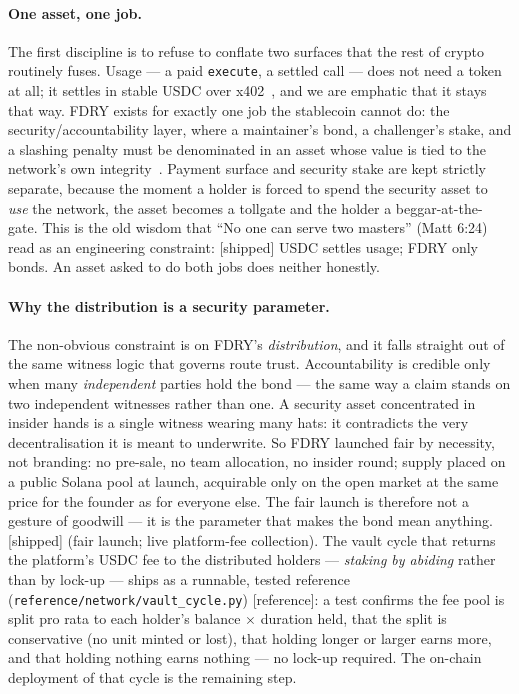\documentclass[11pt]{article}
\newcommand{\impl}{\textcolor{green!55!black}{\small[shipped]}}
\newcommand{\refimpl}{\textcolor{blue!70!black}{\small[reference]}}
\begin{document}
\paragraph{One asset, one job.} The first discipline is to refuse to conflate two
surfaces that the rest of crypto routinely fuses. Usage --- a paid
\texttt{execute}, a settled call --- does not need a token at all; it settles in
stable USDC over x402~\cite{x402}, and we are emphatic that it stays that way. FDRY
exists for exactly one job the stablecoin cannot do: the security/accountability
layer, where a maintainer's bond, a challenger's stake, and a slashing penalty must
be denominated in an asset whose value is tied to the network's own
integrity~\cite{internalapis}. Payment surface and security stake are kept strictly
separate, because the moment a holder is forced to spend the security asset to
\emph{use} the network, the asset becomes a tollgate and the holder a
beggar-at-the-gate. This is the old wisdom that ``No one can serve two masters''
(Matt 6:24) read as an engineering constraint: \impl{} USDC settles usage; FDRY
only bonds. An asset asked to do both jobs does neither honestly.

\paragraph{Why the distribution is a security parameter.} The non-obvious constraint
is on FDRY's \emph{distribution}, and it falls straight out of the same witness
logic that governs route trust. Accountability is credible only when many
\emph{independent} parties hold the bond --- the same way a claim stands on two
independent witnesses rather than one. A security asset concentrated in insider
hands is a single witness wearing many hats: it contradicts the very
decentralisation it is meant to underwrite. So FDRY launched fair by necessity, not
branding: no pre-sale, no team allocation, no insider round; supply placed on a
public Solana pool at launch, acquirable only on the open market at the same price
for the founder as for everyone else. The fair launch is therefore not a gesture of
goodwill --- it is the parameter that makes the bond mean anything. \impl{} (fair
launch; live platform-fee collection). The vault cycle that returns the platform's
USDC fee to the distributed holders --- \emph{staking by abiding} rather than by
lock-up --- ships as a runnable, tested reference
(\texttt{reference/network/vault\_cycle.py}) \refimpl{}: a test confirms the fee
pool is split pro rata to each holder's balance $\times$ duration held, that the
split is conservative (no unit minted or lost), that holding longer or larger earns
more, and that holding nothing earns nothing --- no lock-up required. The on-chain
deployment of that cycle is the remaining step.
\end{document}
